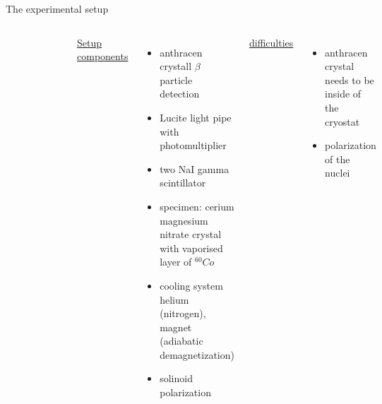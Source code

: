 \documentclass[aspectratio=1610, 10pt]{beamer}
\begin{document}

\begin{frame}{The experimental setup}
	\begin{columns}
		\begin{figure}
			\includegraphics[width=0.82\textwidth]{images/Wu_setup.png}
		\end{figure}
		\nocite{wegener}
		\underline{Setup components}
		\begin{itemize}
			\item anthracen crystall \textrightarrow $\beta$ particle detection
			\item Lucite light pipe with photomultiplier
			\item two NaI gamma scintillator
			\item specimen: cerium magnesium nitrate crystal with vaporised layer of $^{60}Co$
			\item cooling system \textrightarrow helium (nitrogen), magnet (adiabatic demagnetization)
			\item solinoid \textrightarrow polarization
		\end{itemize}
		\underline{difficulties}
		\begin{itemize}
			\item anthracen crystal needs to be inside of the cryostat
			\item polarization of the nuclei
		\end{itemize}
	\end{columns}
\end{frame}
\end{document}
